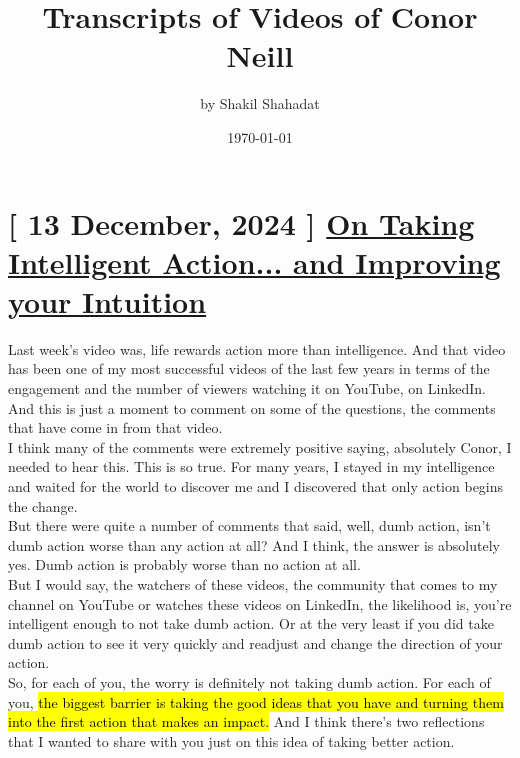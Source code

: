 \documentclass[a4paper,12pt]{article}
\begin{document}
\title{ Transcripts of Videos of Conor Neill  }
	\author{ by Shakil Shahadat }
	\date{ \today }
\maketitle

\thispagestyle{empty}

\newpage




\section{ [ 13 December, 2024 ] \href{https://www.youtube.com/watch?v=5dC5g7wgxOA}{On Taking Intelligent Action... and Improving your Intuition} }


Last week's video was, life rewards action more than intelligence. And that video has been one of my most successful videos of the last few years in terms of the engagement and the number of viewers watching it on YouTube, on LinkedIn. And this is just a moment to comment on some of the questions, the comments that have come in from that video. \\

I think many of the comments were extremely positive saying, absolutely Conor, I needed to hear this. This is so true. For many years, I stayed in my intelligence and waited for the world to discover me and I discovered that only action begins the change. \\
 
But there were quite a number of comments that said, well, dumb action, isn't dumb action worse than any action at all? And I think, the answer is absolutely yes. Dumb action is probably worse than no action at all. \\

But I would say, the watchers of these videos, the community that comes to my channel on YouTube or watches these videos on LinkedIn, the likelihood is, you're intelligent enough to not take dumb action. Or at the very least if you did take dumb action to see it very quickly and readjust and change the direction of your action. \\

So, for each of you, the worry is definitely not taking dumb action. For each of you, \hl{the biggest barrier is taking the good ideas that you have and turning them into the first action that makes an impact.} And I think there's two reflections that I wanted to share with you just on this idea of taking better action. \\
\end{document}
